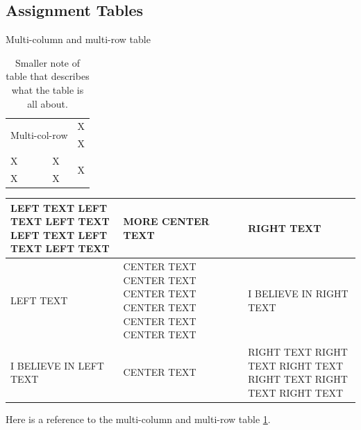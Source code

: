 \documentclass[
english, %
headsepline, %
]{scrartcl} %
\begin{document}
    \subsection{Assignment Tables}
    \begin{table}[ht]
        \caption{Multi-column and multi-row table}
        \caption*{\footnotesize Smaller note of table that describes what the table is all about.}
        \begin{center}
            \begin{tabular}{lcr} %
                \hline
                \multicolumn{2}{c}{\multirow{2}{*}{Multi-col-row}}&X\\ %
                \multicolumn{2}{c}{}&X\\
                \hline
                X&X \vline &  \multirow{2}{*}{X}\\ %
                X&X \vline \\
                \hline
            \end{tabular}
        \end{center}
        \label{tab:multicol}
    \end{table}
    \begin{table}
        \renewcommand\arraystretch{1.3}
        \begin{center}
        \begin{tabular}{ | L{\tabcolsep} | C{\tabcolsep} | R{\tabcolsep} | }  
        \hline
            LEFT TEXT LEFT 
            TEXT LEFT TEXT  
            LEFT TEXT LEFT 
            TEXT LEFT TEXT 
            &
            MORE CENTER TEXT
            &
            RIGHT TEXT \\
        \hline
            LEFT TEXT
            &
            CENTER TEXT CENTER  
            TEXT CENTER TEXT 
            CENTER TEXT CENTER  
            TEXT CENTER TEXT 
            &
            I BELIEVE IN RIGHT TEXT
             \\
        \hline
            I BELIEVE IN LEFT TEXT
            &
            CENTER TEXT
            &
            RIGHT TEXT RIGHT  
            TEXT RIGHT TEXT  
            RIGHT TEXT RIGHT  
            TEXT RIGHT TEXT \\
        \hline
        \end{tabular}
        \end{center}
    \end{table}
    Here is a reference to the multi-column and multi-row table \ref{tab:multicol}.
    
\end{document}

